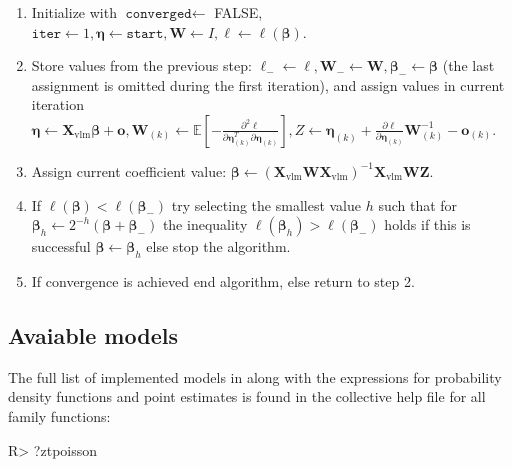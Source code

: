 \documentclass[
]{jss}
\newcommand{\1}{\mathcal{I}} \newcommand{\bx}{\boldsymbol{x}}
\begin{document}
\begin{enumerate}
    \justifying
    \item Initialize with $\texttt{converged} \leftarrow$ FALSE, $\texttt{iter}\leftarrow 1, \boldsymbol{\eta}\leftarrow\texttt{start}, \boldsymbol{W}\leftarrow I, \ell\leftarrow\ell(\boldsymbol{\beta})$.
    \item Store values from the previous step: $\ell_{-}\leftarrow\ell, \boldsymbol{W}_{-}\leftarrow\boldsymbol{W}, \boldsymbol{\beta}_{-}\leftarrow\boldsymbol{\beta}$ (the last assignment is omitted during the first iteration), and assign values in current iteration $\displaystyle\boldsymbol{\eta}\leftarrow\boldsymbol{X}_{\text{vlm}}\boldsymbol{\beta}+\boldsymbol{o}, \boldsymbol{W}_{(k)}\leftarrow\mathbb{E}\left[-\frac{\partial^{2}\ell}{\partial\boldsymbol{\eta}_{(k)}^{T}\partial\boldsymbol{\eta}_{(k)}}\right], Z\leftarrow\boldsymbol{\eta}_{(k)}+\frac{\partial\ell}{\partial\boldsymbol{\eta}_{(k)}}\boldsymbol{W}_{(k)}^{-1}-\boldsymbol{o}_{(k)}$.
    \item Assign current coefficient value: $\boldsymbol{\beta}\leftarrow\left(\boldsymbol{X}_{\text{vlm}}\boldsymbol{W}\boldsymbol{X}_{\text{vlm}}\right)^{-1}\boldsymbol{X}_{\text{vlm}}\boldsymbol{W}\boldsymbol{Z}$.
    \item If $\ell(\boldsymbol{\beta})<\ell(\boldsymbol{\beta}_{-})$ try selecting the smallest value $h$ such that for $\boldsymbol{\beta}_{h}\leftarrow2^{-h}\left(\boldsymbol{\beta}+\boldsymbol{\beta}_{-}\right)$ the inequality $\ell(\boldsymbol{\beta}_{h})>\ell(\boldsymbol{\beta}_{-})$ holds if this is successful $\boldsymbol{\beta}\leftarrow\boldsymbol{\beta}_{h}$ else stop the algorithm.
    \item If convergence is achieved end algorithm, else return to step 2.
\end{enumerate}

\hypertarget{avaiable-models}{%
\subsection{Avaiable models}\label{avaiable-models}}

The full list of implemented models in  along with
the expressions for probability density functions and point estimates is
found in the collective help file for all family functions:

\begin{CodeChunk}
\begin{CodeInput}
R> ?ztpoisson
\end{CodeInput}
\end{CodeChunk}
\end{document}
